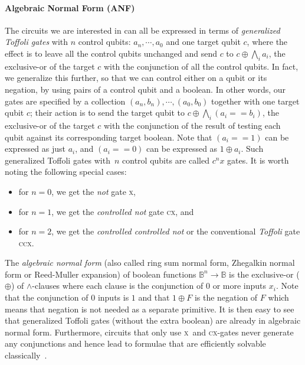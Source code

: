 \documentclass[sigplan,review]{acmart}
\newcommand{\x}{\textsc{x}}
\newcommand{\cx}{\textsc{cx}}
\newcommand{\ccx}{\textsc{ccx}}
\newcommand{\Bool}{\ensuremath{\mathbb{B}}}
\theoremstyle{definition}
\begin{document}
\paragraph*{Algebraic Normal Form (ANF)}

The circuits we are interested in can all be expressed in terms of
\emph{generalized Toffoli gates} with $n$ control qubits:
$a_{n},\cdots,a_0$ and one target qubit $c$, where the effect is to
leave all the control qubits unchanged and send $c$ to
$c \oplus \bigwedge_i a_i$, the exclusive-or of the target $c$ with
the conjunction of all the control qubits. In fact, we generalize this
further, so that we can control either on a qubit or its negation, by
using pairs of a control qubit and a boolean. In other words, our
gates are specified by a collection $(a_{n}, b_{n}),\cdots,(a_0,b_0)$
together with one target qubit $c$; their action is to send the target
qubit to $c \oplus \bigwedge_i \left(a_i == b_i\right)$, the
exclusive-or of the target $c$ with the conjunction of the result of
testing each qubit against its corresponding target boolean. Note that
$\left(a_i == 1\right)$ can be expressed as just $a_i$, and
$\left(a_i == 0\right)$ can be expressed as $1 \oplus a_i$.  Such
generalized Toffoli gates with~$n$ control qubits are called $c^nx$
gates. It is worth noting the following special cases:
\begin{itemize}
  \item for $n=0$, we get the \emph{not} gate \x, 
  \item for $n=1$, we get the \emph{controlled not} gate \cx, and
  \item for $n=2$, we get the \emph{controlled controlled not} or the
    conventional \emph{Toffoli} gate \ccx.
\end{itemize}

The \emph{algebraic normal form} (also called ring sum normal form,
Zhegalkin normal form or Reed-Muller expansion) of boolean functions
$\Bool^n\rightarrow\Bool$ is the exclusive-or ($\oplus$) of
$\wedge$-clauses where each clause is the conjunction of 0 or more
inputs $x_i$. Note that the conjunction of $0$ inputs is $1$ and that
$1 \oplus F$ is the negation of $F$ which means that negation is not
needed as a separate primitive. It is then easy to see that
generalized Toffoli gates (without the extra boolean) are already in
algebraic normal form.  Furthermore, circuits that only use \x\ and
\cx-gates never generate any conjunctions and hence lead to formulae
that are efficiently solvable
classically~\cite{10.5555/35517,TOKAREVA20151}.
\end{document}
